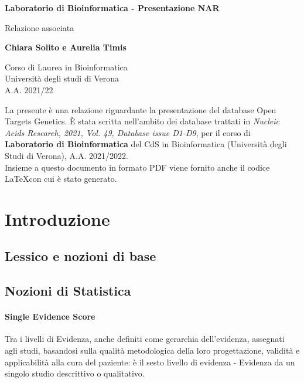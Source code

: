 \documentclass{article}
\begin{document}
\newcommand\tab[1][0.3cm]{\hspace*{#1}}


\begin{titlepage}
    \begin{center}
        \vspace*{1cm}
            
        \Huge
        \textbf{Laboratorio di Bioinformatica - Presentazione NAR}
            
        \vspace{0.5cm}
        \LARGE
        Relazione associata
            
        \vspace{1.5cm}
            
        \textbf{Chiara Solito e Aurelia Timis}

        \vspace{0.8cm}

            
        \Large
        Corso di Laurea in Bioinformatica\\
        Università degli studi di Verona\\
        A.A. 2021/22
            
    \end{center}
\end{titlepage}
La presente è una relazione riguardante la presentazione del database Open Targets Genetics. È stata scritta nell'ambito dei database trattati in \textit{Nucleic Acids Research, 2021, Vol. 49, Database issue D1-D9}, per il corso di \textbf{Laboratorio di Bioinformatica} del CdS in Bioinformatica (Università degli Studi di Verona), A.A. 2021/2022.\\
Insieme a questo documento in formato PDF viene fornito anche il codice \LaTeX  con cui è stato generato.
\tableofcontents
\thispagestyle{empty}
\newpage
\thispagestyle{empty}
\section{Introduzione}
\subsection{Lessico e nozioni di base}
\subsection*{Nozioni di Statistica}
\paragraph{Single Evidence Score}
Tra i livelli di Evidenza, anche definiti come gerarchia dell'evidenza, assegnati agli studi, basandosi sulla qualità metodologica della loro progettazione, validità e applicabilità alla cura del paziente: è il sesto livello di evidenza - Evidenza da un singolo studio descrittivo o qualitativo.
\end{document}
